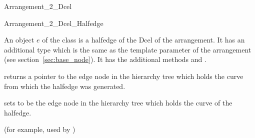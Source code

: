 \begin{ccRefConcept}{Arrangement_2_Dcel}
\begin{ccClass}{Arrangement_2_Dcel_Halfedge}


\ccDefinition An object $e$ of the class
     is a halfedge of the Dcel of the
    arrangement.
    It has an additional type  which is the
    same as the template parameter  of the
    arrangement (see section~\ref{sec:base_node}).
    It has the additional methods  
    and .

\ccOperations
    {returns a pointer to the edge node in the hierarchy tree which
       holds the curve from 
       which the halfedge was generated.}

    {sets  to be the edge node in the hierarchy tree which
       holds the curve of the halfedge.}


\ccHasModels
   (for example, used by
   )


\end{ccClass}

\end{ccRefConcept}



\ccRefPageEnd
